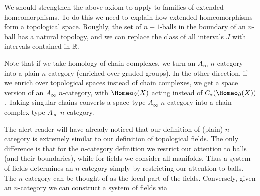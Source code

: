 We should strengthen the above axiom to apply to families of extended homeomorphisms.
To do this we need to explain how extended homeomorphisms form a topological space.
Roughly, the set of $n{-}1$-balls in the boundary of an $n$-ball has a natural topology,
and we can replace the class of all intervals $J$ with intervals contained in $\mathbb{R}$.

Note that if we take homology of chain complexes, we turn an $A_\infty$ $n$-category
into a plain $n$-category (enriched over graded groups).
In the other direction, if we enrich over topological spaces instead of chain complexes,
we get a space version of an $A_\infty$ $n$-category, with $\Homeo_\bd(X)$ acting 
instead of  $C_*(\Homeo_\bd(X))$.
Taking singular chains converts a space-type $A_\infty$ $n$-category into a chain complex
type $A_\infty$ $n$-category.

\medskip

The alert reader will have already noticed that our definition of (plain) $n$-category
is extremely similar to our definition of topological fields.
The only difference is that for the $n$-category definition we restrict our attention to balls
(and their boundaries), while for fields we consider all manifolds.
Thus a system of fields determines an $n$-category simply by restricting our attention to
balls.
The $n$-category can be thought of as the local part of the fields.
Conversely, given an $n$-category we can construct a system of fields via 


\medskip


